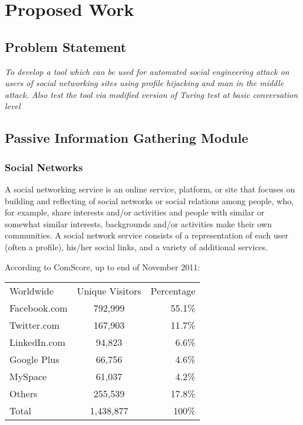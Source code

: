 \chapter{Proposed Work}

\section{Problem Statement}
\emph{To develop a tool which can be used for automated social engineering attack on users of social networking sites using profile hijacking and man in the middle attack. Also test the tool via modified version of Turing test at basic conversation level}

\section{Passive Information Gathering Module}

\subsection{Social Networks}
A social networking service is an online service, platform, or site that focuses on building and reflecting of social networks or social relations among people, who, for example, share interests and/or activities and people with similar or somewhat similar interests, backgrounds and/or activities make their own communities.
A social network service consists of a representation of each user (often a
profile), his/her social links, and a variety of additional services.

According to ComScore, up to end of November 2011:\cite{marketshare}

\begin{table}[h]\large
\centering
\begin{tabular}{l | c | r}
Worldwide & Unique Visitors & Percentage\\
Facebook.com & 792,999 	& 55.1\%\\
Twitter.com & 167,903 & 11.7\%\\
LinkedIn.com & 94,823 & 6.6\%\\
Google Plus & 66,756 & 4.6\%\\
MySpace & 61,037 & 4.2\%\\
Others & 255,539 & 17.8\%\\
Total & 1,438,877 & 100\%\\
\end{tabular}
\end{table}

